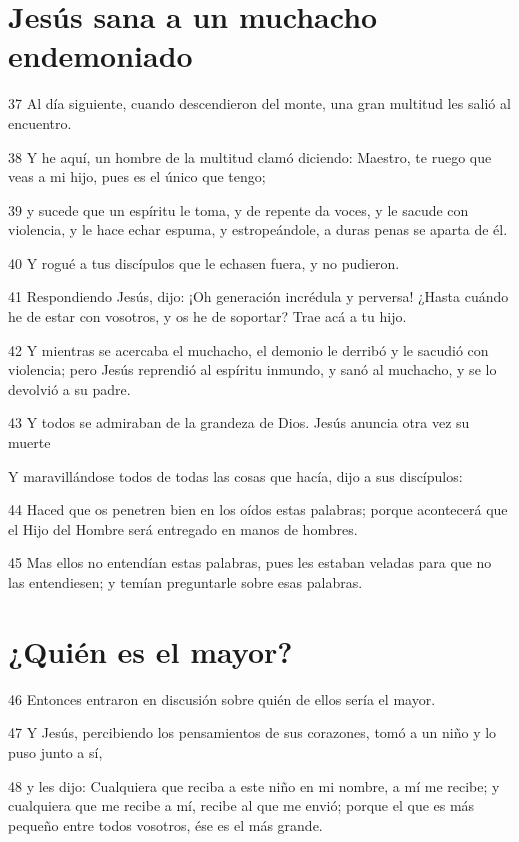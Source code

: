\section*{Jesús sana a un muchacho endemoniado}

\par 37 Al día siguiente, cuando descendieron del monte, una gran multitud les salió al encuentro.
\par 38 Y he aquí, un hombre de la multitud clamó diciendo: Maestro, te ruego que veas a mi hijo, pues es el único que tengo;
\par 39 y sucede que un espíritu le toma, y de repente da voces, y le sacude con violencia, y le hace echar espuma, y estropeándole, a duras penas se aparta de él.
\par 40 Y rogué a tus discípulos que le echasen fuera, y no pudieron.
\par 41 Respondiendo Jesús, dijo: ¡Oh generación incrédula y perversa! ¿Hasta cuándo he de estar con vosotros, y os he de soportar? Trae acá a tu hijo.
\par 42 Y mientras se acercaba el muchacho, el demonio le derribó y le sacudió con violencia; pero Jesús reprendió al espíritu inmundo, y sanó al muchacho, y se lo devolvió a su padre.
\par 43 Y todos se admiraban de la grandeza de Dios. Jesús anuncia otra vez su muerte
\par Y maravillándose todos de todas las cosas que hacía, dijo a sus discípulos:
\par 44 Haced que os penetren bien en los oídos estas palabras; porque acontecerá que el Hijo del Hombre será entregado en manos de hombres.
\par 45 Mas ellos no entendían estas palabras, pues les estaban veladas para que no las entendiesen; y temían preguntarle sobre esas palabras.

\section*{¿Quién es el mayor?}

\par 46 Entonces entraron en discusión sobre quién de ellos sería el mayor.
\par 47 Y Jesús, percibiendo los pensamientos de sus corazones, tomó a un niño y lo puso junto a sí,
\par 48 y les dijo: Cualquiera que reciba a este niño en mi nombre, a mí me recibe; y cualquiera que me recibe a mí, recibe al que me envió; porque el que es más pequeño entre todos vosotros, ése es el más grande.


